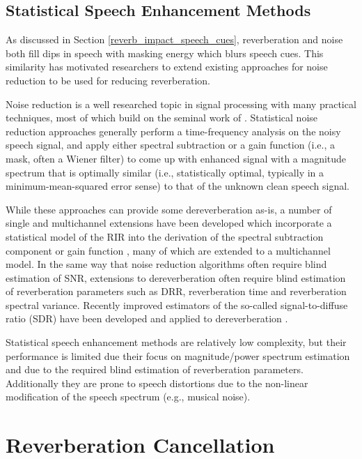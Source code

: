 \subsection{Statistical Speech Enhancement Methods}

As discussed in Section \ref{reverb_impact_speech_cues}, reverberation and noise both fill dips in speech with masking energy which blurs speech cues. This similarity has motivated researchers to extend existing approaches for noise reduction to be used for reducing reverberation. 

Noise reduction is a well researched topic in signal processing with many practical techniques, most of which build on the seminal work of \cite{ephraim1984speech, ephraim1985speech}. Statistical noise reduction approaches generally perform a time-frequency analysis on the noisy speech signal, and apply either spectral subtraction or a gain function (i.e., a mask, often a Wiener filter) to come up with enhanced signal with a magnitude spectrum that is optimally similar (i.e., statistically optimal, typically in a minimum-mean-squared error sense) to that of the unknown clean speech signal.

While these approaches can provide some dereverberation as-is, a number of single and multichannel extensions have been developed which incorporate a statistical model of the RIR \citep[e.g., Polack's Model, ][]{polack1988transmission} into the derivation of the spectral subtraction component or gain function \citep{lebart2001new, habets2005multi, habets2007single, erkelens2010correlation, braun2013informed, schwartz2014multi}, many of which are extended to a multichannel model. In the same way that noise reduction algorithms often require blind estimation of SNR, extensions to dereverberation often require blind estimation of reverberation parameters such as DRR, reverberation time and reverberation spectral variance. Recently improved estimators of the so-called signal-to-diffuse ratio (SDR) have been developed and applied to dereverberation \citep{thiergart2012signal, thiergart2014power}. 

Statistical speech enhancement methods are relatively low complexity, but their performance is limited due their focus on magnitude/power spectrum estimation and due to the required blind estimation of reverberation parameters. Additionally they are prone to speech distortions due to the non-linear modification of the speech spectrum (e.g., musical noise). 

\section{Reverberation Cancellation}

